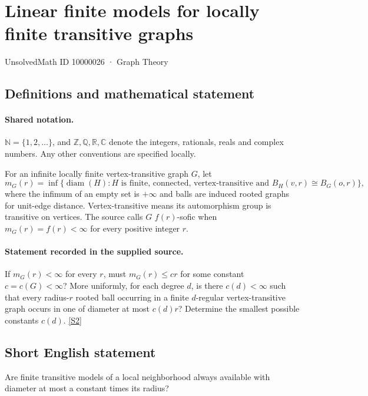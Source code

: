 \documentclass[11pt]{article}
\newcommand{\sref}[2]{\hyperlink{source:#1:#2}{[S#2]}}
\begin{document}
\setcounter{section}{10000025}
\section{Linear finite models for locally finite transitive graphs}\label{10000026}
{\small\sffamily UnsolvedMath ID 10000026 · Graph Theory}
\subsection{Definitions and mathematical statement}

\paragraph{Shared notation.}$\mathbb N=\{1,2,\ldots\}$, and $\mathbb Z,\mathbb Q,\mathbb R,\mathbb C$ denote the integers, rationals, reals and complex numbers. Any other conventions are specified locally.


For an infinite locally finite vertex-transitive graph $G$, let
\[m_G(r)=\inf\{\operatorname{diam}(H):H\text{ is finite, connected, vertex-transitive and }B_H(v,r)\cong B_G(o,r)\},\]
where the infimum of an empty set is $+\infty$ and balls are induced rooted graphs for unit-edge distance. Vertex-transitive means its automorphism group is transitive on vertices. The source calls $G$ $f(r)$-sofic when $m_G(r)=f(r)<\infty$ for every positive integer $r$.
\paragraph{Statement recorded in the supplied source.}
If $m_G(r)<\infty$ for every $r$, must $m_G(r)\le cr$ for some constant $c=c(G)<\infty$? More uniformly, for each degree $d$, is there $c(d)<\infty$ such that every radius-$r$ rooted ball occurring in a finite $d$-regular vertex-transitive graph occurs in one of diameter at most $c(d)r$? Determine the smallest possible constants $c(d)$. \sref{10000026}{2}
\subsection{Short English statement}
Are finite transitive models of a local neighborhood always available with diameter at most a constant times its radius?
\end{document}
